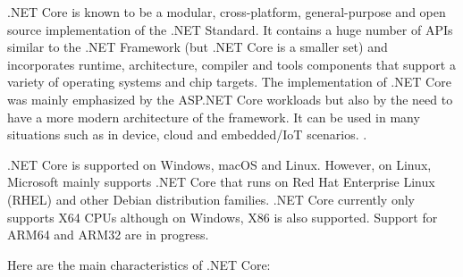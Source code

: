 \documentclass[../thesis.tex]{subfiles}
\begin{document}
.NET Core is known to be a modular, cross-platform, general-purpose and open source implementation of the .NET Standard. It contains a huge number of APIs similar to the .NET Framework (but .NET Core is a smaller set) and incorporates runtime, architecture, compiler and tools components that support a variety of operating systems and chip targets. The implementation of .NET Core was mainly emphasized by the ASP.NET Core workloads but also by the need to have a more modern architecture of the framework. It can be used in many situations such as in device, cloud and embedded/IoT scenarios. \cite{dotnet}.
\newline
    
.NET Core is supported on Windows, macOS and Linux. However, on Linux, Microsoft mainly supports .NET Core that runs on Red Hat Enterprise Linux (RHEL) and other Debian distribution families. .NET Core currently only supports X64 CPUs although on Windows, X86 is also supported. Support for ARM64 and ARM32 are in progress.
\newline
    
Here are the main characteristics of .NET Core:
\newline
    
\end{document}
